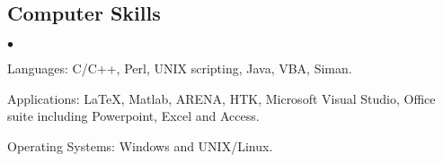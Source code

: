 \documentclass[margin,line]{resume}
\newenvironment{list2}{
  \begin{list}{$\bullet$}{%
      \setlength{\itemsep}{0in}
      \setlength{\parsep}{0in} \setlength{\parskip}{0in}
      \setlength{\topsep}{0in} \setlength{\partopsep}{0in}
      \setlength{\leftmargin}{0.2in}}}{\end{list}}
\begin{document}
\begin{resume}
\section{\sc Computer Skills}
\begin{list2}
\item Languages: C/C++, Perl, UNIX scripting, Java, VBA, Siman.
\item Applications: \LaTeX, Matlab, ARENA, HTK, Microsoft Visual Studio, Office suite including
    Powerpoint, Excel and Access.
\item Operating Systems: Windows and UNIX/Linux.
\end{list2}
\newpage
%



\end{resume}
\end{document}
